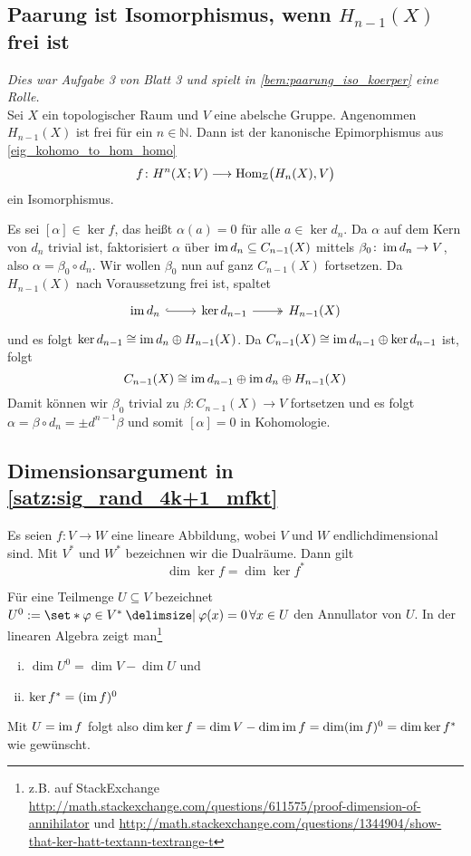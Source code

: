 \subsection{Paarung ist Isomorphismus, wenn $H_{n-1}(X)$ frei ist} %
\label{sub:paarung_isomorphismus_frei}
\emph{Dies war Aufgabe 3 von Blatt 3 und spielt in \autoref{bem:paarung_iso_koerper} eine Rolle.}\smallskip\\
Sei $X$ ein topologischer Raum und $V$ eine abelsche Gruppe.
Angenommen $H_{n-1}(X)$ ist frei für ein $n \in \mathbb{N}$.
Dann ist der kanonische Epimorphismus aus \autoref{eig_kohomo_to_hom_homo}
\[
	f \colon H^n(X;V) \longrightarrow \Hom_\mathbb{Z} \enbrace[\big]{H_n(X),V}
\]
ein Isomorphismus.
\begin{beweis}
	Es sei $[\alpha] \in \ker f$, das heißt $\alpha(a)=0$ für alle $a \in \ker d_n$.
	Da $\alpha$ auf dem Kern von $d_n$ trivial ist, faktorisiert $\alpha$ über $\im d_n \subseteq C_{n-1}(X)$ mittels $\beta_0 \colon \im d_n \to V$, also $\alpha = \beta_0 \circ d_n$.
	Wir wollen $\beta_0$ nun auf ganz $C_{n-1}(X)$ fortsetzen.
	Da $H_{n-1}(X)$ nach Voraussetzung frei ist, spaltet 
	\[
		\begin{tikzcd}
			\im d_n \rar[hook] & \ker d_{n-1} \rar[two heads] & H_{n-1}(X)
		\end{tikzcd}
	\]
	und es folgt $\ker d_{n-1} \cong \im d_n \oplus H_{n-1}(X)$.
	Da $C_{n-1}(X) \cong \im d_{n-1} \oplus \ker d_{n-1}$ ist, folgt
	\[
		C_{n-1}(X) \cong \im d_{n-1} \oplus \im d_n \oplus H_{n-1}(X)
	\]
	Damit können wir $\beta_0$ trivial zu $\beta \colon C_{n-1}(X) \to V$ fortsetzen und es folgt $\alpha= \beta \circ d_n = \pm d^{n-1} \beta$ und somit $[\alpha]=0$ in Kohomologie.
\end{beweis}

\subsection{Dimensionsargument in \autoref{satz:sig_rand_4k+1_mfkt}} %
\label{sub:dimensionsargument_rand_mfkt}
Es seien $f \colon V \to W$ eine lineare Abbildung, wobei $V$ und $W$ endlichdimensional sind. 
Mit $V^*$ und $W^*$ bezeichnen wir die Dualräume.
Dann gilt
\[
	\dim \ker f = \dim \ker f^*
\]
\begin{beweis}
	Für eine Teilmenge $U \subseteq V$ bezeichnet $U^0 := \set*{\varphi \in V^* \given \varphi(x)=0 \,\forall x \in U}$ den Annullator von $U$.
	In der linearen Algebra zeigt man\footnote{z.B. auf StackExchange \url{http://math.stackexchange.com/questions/611575/proof-dimension-of-annihilator} und \url{http://math.stackexchange.com/questions/1344904/show-that-ker-hatt-textann-textrange-t}}
	\begin{enumerate}[(i)]
		\item $\dim U^0 = \dim V - \dim U$ und
		\item $\ker f^* = (\im f)^0$
	\end{enumerate}
	Mit $U= \im f$ folgt also
	\(
		\dim \ker f = \dim V - \dim \im f = \dim (\im f)^0 = \dim \ker f^* 
	\) wie gewünscht.
\end{beweis}

